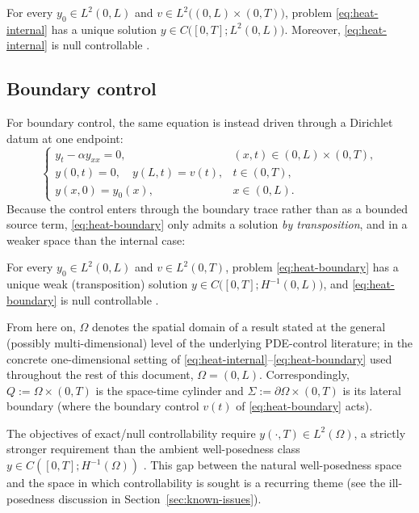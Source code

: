 \begin{theorem}
  \label{thm:wp-internal}
  For every $y_0 \in L^2(0,L)$ and $v \in L^2\big((0,L)\times(0,T)\big)$,
  problem \eqref{eq:heat-internal} has a unique solution
  $y \in C\big([0,T];L^2(0,L)\big)$. Moreover, \eqref{eq:heat-internal} is null
  controllable \citep{fursikov1996imanuvilov}.
\end{theorem}

\subsection{Boundary control}
\label{ssec:wp-boundary}

For boundary control, the same equation is instead driven through a Dirichlet
datum at one endpoint:
\begin{equation}
  \label{eq:heat-boundary}
  \begin{cases}
    y_t - \alpha y_{xx} = 0, & (x,t) \in (0,L)\times(0,T),\\
    y(0,t) = 0, \quad y(L,t) = v(t), & t \in (0,T),\\
    y(x,0) = y_0(x), & x \in (0,L).
  \end{cases}
\end{equation}
Because the control enters through the boundary trace rather than as a bounded
source term, \eqref{eq:heat-boundary} only admits a solution \emph{by
transposition}, and in a weaker space than the internal case:

\begin{theorem}
  \label{thm:wp-boundary}
  For every $y_0 \in L^2(0,L)$ and $v \in L^2(0,T)$, problem
  \eqref{eq:heat-boundary} has a unique weak (transposition) solution
  $y \in C\big([0,T]; H^{-1}(0,L)\big)$, and \eqref{eq:heat-boundary} is null
  controllable \citep{fursikov1996imanuvilov}.
\end{theorem}

From here on, $\Omega$ denotes the spatial domain of a result stated at the
general (possibly multi-dimensional) level of the underlying PDE-control
literature; in the concrete one-dimensional setting of
\eqref{eq:heat-internal}--\eqref{eq:heat-boundary} used throughout the rest of
this document, $\Omega = (0,L)$. Correspondingly, $Q := \Omega\times(0,T)$ is
the space-time cylinder and $\Sigma := \partial\Omega\times(0,T)$ is its
lateral boundary (where the boundary control $v(t)$ of
\eqref{eq:heat-boundary} acts).

\begin{remark}
  The objectives of exact/null controllability require $y(\cdot,T) \in
  L^2(\Omega)$, a strictly stronger requirement than the ambient
  well-posedness class $y \in C([0,T];H^{-1}(\Omega))$ \citep{belgacem2011dirichlet}.
  This gap between the natural well-posedness space and the space in which
  controllability is sought is a recurring theme (see the ill-posedness
  discussion in Section~\ref{sec:known-issues}).
\end{remark}

